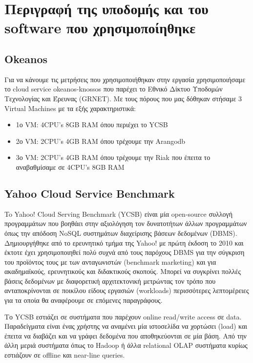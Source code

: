 \documentclass[conference]{IEEEtran}
\begin{document}
\section{Περιγραφή της υποδομής και του software που χρησιμοποίηθηκε}

\subsection{Okeanos}
Για να κάνουμε τις μετρήσεις που χρησιμοποιήθηκαν στην εργασία χρησιμοποιήσαμε το cloud service okeanos-knossos που παρέχει το Εθνικό Δίκτυο Υποδομών Τεχνολογίας και Έρευνας (GRNET). Mε τους πόρους που μας δόθηκαν στήσαμε 3 Virtual Machines με τα εξής χαρακτηριστικά:
\begin{itemize}

\item
1ο VM: 4CPU’s 8GB RAM όπου περιέχει το YCSB
\item
2ο VM: 2CPU’s 4GB RAM όπου τρέχουμε την Arangodb
\item
3ο VM: 2CPU’s 4GB RAM όπου τρέχουμε την Riak  που έπειτα το αναβαθμίσαμε σε 4CPU’s 8GB RAM

\end{itemize}

\subsection{Yahoo Cloud Service Benchmark}
        To Yahoo! Cloud Serving Benchmark (YCSB) είναι μία open-source συλλογή προγραμμάτων που βοηθάει στην αξιολόγηση τον δυνατοτήτων άλλων προγραμμάτων όπως την απόδοση NoSQL συστημάτων διαχείρισης βάσεων δεδομένων (DBMS). Δημιουργήθηκε από το ερευνητικό τμήμα της Yahoo! με πρώτη έκδοση το 2010 και έκτοτε έχει χρησιμοποιηθεί πολύ συχνά από τους παρόχους DBMS για την σύγκριση του προϊόντος τους με των ανταγωνιστών (benchmark marketing) και για ακαδημαϊκούς, ερευνητικούς και διδακτικούς σκοπούς. Μπορεί να συγκρίνει πολλές βάσεις δεδομένων με διαφορετική αρχιτεκτονική μετρώντας τον τρόπο που ανταποκρίνονται σε ποικίλου είδους εργασιών (workloads) περισσότερες λεπτομέρειες για τα οποία θα αναφέρουμε σε επόμενες παραγράφους.
       
        Το YCSB εστιάζει σε συστήματα που παρέχουν online read/write access σε data. Παραδείγματα είναι ένας χρήστης να αναμένει μία ιστοσελίδα να χορτώσει (load) και έπειτα να διαβάζει και να γράφει δεδομένα που αποθηκεύονται σε μία βάση. Από την άλλη μεριά συστήματα όπως το Hadoop ή  άλλα relational OLAP συστήματα κυρίως εστιάζουν σε offline και near-line queries.
	   
\end{document}
